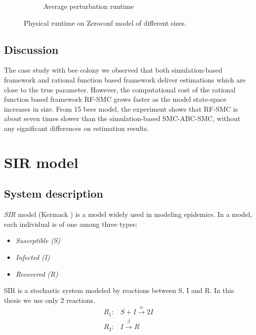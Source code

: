 \begin{figure}[H]
\begin{subfigure}{0.48\textwidth}
        \caption{Average perturbation runtime}
    \end{subfigure}
    \caption{Physical runtime on Zeroconf model of different sizes.}
\end{figure}
\subsection{Discussion}
The case study with bee colony we observed that both simulation-based framework and rational
function based framework deliver estimations which are close to the true parameter. However, the
computational cost of the rational function based framework RF-SMC grows faster as the model
state-space increases in size. From 15 bees model, the experiment shows that RF-SMC is about seven
times slower than the simulation-based SMC-ABC-SMC, without any significant differences on
estimation results.

\section{SIR model}
\subsection{System description}
\textit{SIR} model (Kermack \cite{kermack1927contribution}) is a model widely used in modeling
epidemics. In a  model, each individual is of one among three types:
\begin{itemize}
    \item \textit{Susceptible (S)}
    \item \textit{Infected (I)}
    \item \textit{Recovered (R)}
\end{itemize}
SIR is a stochastic system modeled by reactions between S, I and R. In this thesis we use
only 2 reactions.
\begin{align*}
    R_1: & S + I \xrightarrow{\alpha} 2I \\
    R_2: & I     \xrightarrow{\beta} R
\end{align*}

